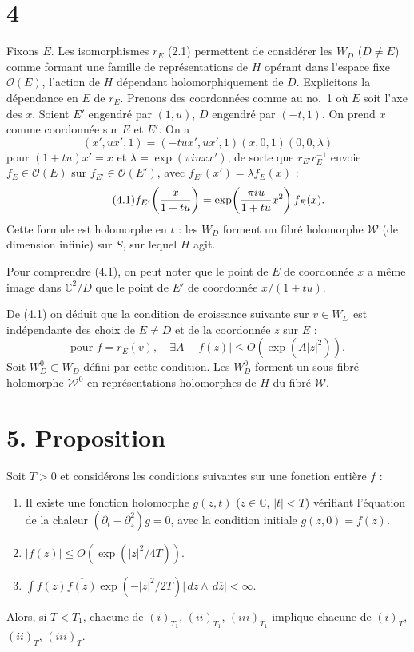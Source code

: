 \documentclass[11pt]{article}
\newcommand{\C}{\mathbb C}
\newcommand{\cO}{\mathcal O}
\newcommand{\cW}{\mathcal W}
\newcommand{\dd}{\,d}
\begin{document}
\section*{4}
Fixons $E$. Les isomorphismes $r_E$ (2.1) permettent de considérer les $W_D$ ($D\ne E$) comme formant une famille de représentations de $H$ opérant dans l'espace fixe $\cO(E)$, l'action de $H$ dépendant holomorphiquement de $D$. Explicitons la dépendance en $E$ de $r_E$. Prenons des coordonnées comme au no.~1 où $E$ soit l'axe des $x$. Soient $E'$ engendré par $(1,u)$, $D$ engendré par $(-t,1)$. On prend $x$ comme coordonnée sur $E$ et $E'$. On a
\[
(x',ux',1)=(-tux',ux',1)(x,0,1)(0,0,\lambda)
\]
pour $(1+tu)x'=x$ et $\lambda=\exp(\pi iuxx')$, de sorte que $r_{E'}r_E^{-1}$ envoie $f_E\in\cO(E)$ sur $f_{E'}\in\cO(E')$, avec $f_{E'}(x')=\lambda f_E(x)$ :
\begin{equation}\tag{4.1}
f_{E'}\!\left({x\over1+tu}\right)=\exp\!\left({\pi iu\over1+tu}x^2\right)f_E(x).
\end{equation}
Cette formule est holomorphe en $t$ : les $W_D$ forment un fibré holomorphe $\cW$ (de dimension infinie) sur $S$, sur lequel $H$ agit.

Pour comprendre (4.1), on peut noter que le point de $E$ de coordonnée $x$ a même image dans $\C^2/D$ que le point de $E'$ de coordonnée $x/(1+tu)$.

De (4.1) on déduit que la condition de croissance suivante sur $v\in W_D$ est indépendante des choix de $E\ne D$ et de la coordonnée $z$ sur $E$ :
\begin{equation}\tag{4.2}
\text{pour }f=r_E(v),\quad \exists A\quad |f(z)|\le O(\exp(A|z|^2)).
\end{equation}
Soit $W_D^0\subset W_D$ défini par cette condition. Les $W_D^0$ forment un sous-fibré holomorphe $\cW^0$ en représentations holomorphes de $H$ du fibré $\cW$.

\section*{5. Proposition}
Soit $T>0$ et considérons les conditions suivantes sur une fonction entière $f$ :
\begin{enumerate}[label=(\roman*)$_T$]
\item Il existe une fonction holomorphe $g(z,t)$ ($z\in\C$, $|t|<T$) vérifiant l'équation de la chaleur $(\partial_t-\partial_z^2)g=0$, avec la condition initiale $g(z,0)=f(z)$.
\item $|f(z)|\le O(\exp(|z|^2/4T))$.
\item $\displaystyle \int f(z)\overline{f(z)}\exp(-|z|^2/2T)|\dd z\wedge\dd\overline z|<\infty$.
\end{enumerate}
Alors, si $T<T_1$, chacune de $(i)_{T_1}$, $(ii)_{T_1}$, $(iii)_{T_1}$ implique chacune de $(i)_T$, $(ii)_T$, $(iii)_T$.
\end{document}
